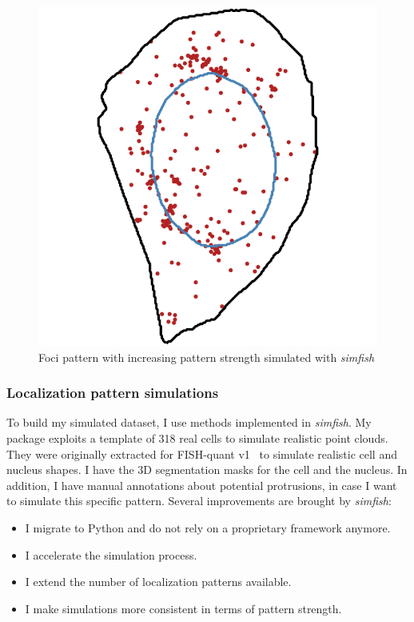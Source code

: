 \begin{figure}[]
	\endminipage\hfill
		\includegraphics[width=\linewidth]{figures/chapter4/simulation_foci_90}
	\endminipage
	\caption[Simulated foci patterns]{Foci pattern with increasing pattern strength simulated with \emph{simfish}}
	\label{fig:foci_panel}
\end{figure}

\subsubsection{Localization pattern simulations}

To build my simulated dataset, I use methods implemented in \emph{simfish}.
My package exploits a template of 318 real cells to simulate realistic point clouds.
They were originally extracted for FISH-quant v1~\cite{samacoits_computational_2018} to simulate realistic cell and nucleus shapes.
I have the 3D segmentation masks for the cell and the nucleus.
In addition, I have manual annotations about potential protrusions, in case I want to simulate this specific pattern.
Several improvements are brought by \emph{simfish}:
\begin{itemize}
	\setlength\itemsep{0.1em}
	\item I migrate to Python and do not rely on a proprietary framework anymore.
	\item I accelerate the simulation process.
	\item I extend the number of localization patterns available.
	\item I make simulations more consistent in terms of pattern strength.
\end{itemize}

